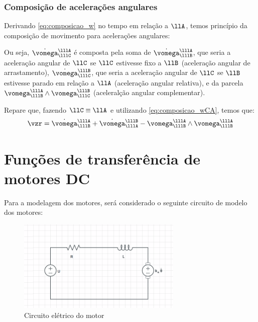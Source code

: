 \documentclass[]{politex}
\newcommand*\mybluebox[1]{%
\colorbox{myblue}{\hspace{1em}#1\hspace{1em}}}
\newcommand*\almondbox[1]{%
\colorbox{almond}{\hspace{1em}#1\hspace{1em}}}
\begin{document}
\subsection{Composição de acelerações angulares}

Derivando \eqref{eq:composicao_w} no tempo em relação a $\llA$, temos princípio da composição de movimento para acelerações angulares:

Ou seja, $\dot{\vomega}_{\lllC}^{\lllA}$ é composta pela soma de $\dot{\vomega}_{\lllB}^{\lllA}$, que seria a aceleração angular  de $\llC$ se $\llC$ estivesse fixo a $\llB$ (aceleração angular de arrastamento), $\dot{\vomega}_{\lllC}^{\lllB}$, que seria a aceleração angular de $\llC$ se $\llB$ estivesse parado em relação a $\llA$ (aceleração angular relativa), e da parcela $\vomega_{\lllB}^{\lllA} \wedge \vomega_{\lllC}^{\lllB}$ (aceleralção angular complementar).

Repare que, fazendo $\llC \equiv \llA$ e utilizando \eqref{eq:composicao_wCA}, temos que:
\begin{equation}
\vzr =  \dot{\vomega}_{\lllB}^{\lllA}   + \dot{\vomega}_{\lllA}^{\lllB} - \vomega_{\lllB}^{\lllA} \wedge \vomega_{\lllB}^{\lllA}
\end{equation}

\chapter{Funções de transferência de motores DC} \label{apendiceB}

Para a modelagem dos motores, será considerado o seguinte circuito de modelo dos motores:


\begin{figure}[!h]
     \centering
     \includegraphics[width=0.7\textwidth]{imagens/CircuitoMotor.png}
     \caption{Circuito elétrico do motor}
     \label{CEM1}
\end{figure}
\end{document}
